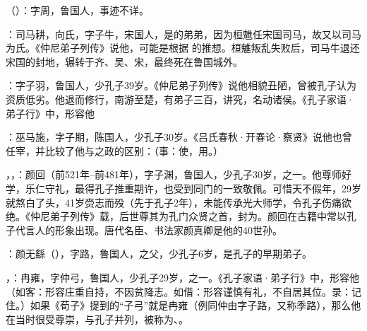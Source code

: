 （）：字周，鲁国人，事迹不详。

：司马耕，向氏，字子牛，宋国人，是的弟弟，因为桓魋任宋国司马，故又以司马为氏。《仲尼弟子列传》说他，可能是根据  的推想。桓魋叛乱失败后，司马牛退还宋国的封地，辗转于齐、吴、宋，最终死在鲁国城外。

：字子羽，鲁国人，少孔子39岁。《仲尼弟子列传》说他相貌丑陋，曾被孔子认为资质低劣。他退而修行，南游至楚，有弟子三百，讲究，名动诸侯。《孔子家语·弟子行》中，形容他

：巫马施，字子期，陈国人，少孔子30岁。《吕氏春秋·开春论·察贤》说他也曾任宰，并比较了他与之政的区别：（事：使，用。）

，，：颜回（前521年--前481年），字子渊，鲁国人，少孔子30岁，之一。他尊师好学，乐仁守礼，最得孔子推重期许，也受到同门的一致敬佩。可惜天不假年，29岁就熬白了头，41岁赍志而殁（先于孔子2年），未能传承光大师学，令孔子伤痛欲绝。《仲尼弟子列传》载，后世尊其为孔门众贤之首，封为。颜回在古籍中常以孔子代言人的形象出现。唐代名臣、书法家颜真卿是他的40世孙。%

：颜无繇（），字路，鲁国人，之父，少孔子6岁，是孔子的早期弟子。

，：冉雍，字仲弓，鲁国人，少孔子29岁，之一。《孔子家语·弟子行》中，形容他（如客：形容庄重自持，不因贫降志。如借：形容谨慎有礼，不自居其位。录：记住。）如果《荀子》提到的“子弓”就是冉雍（例同仲由字子路，又称季路），那么他在当时很受尊崇，与孔子并列，被称为、。%

